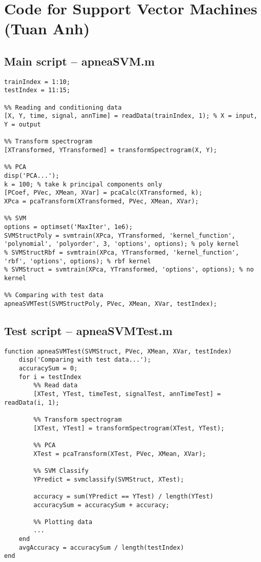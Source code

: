 \chapter{Code for Support Vector Machines (Tuan Anh)}
\label{ch:SVMCode}

\section{Main script -- apneaSVM.m}
\label{sec:apneaSVM}
\begin{lstlisting}
trainIndex = 1:10;
testIndex = 11:15;

%% Reading and conditioning data
[X, Y, time, signal, annTime] = readData(trainIndex, 1); % X = input, Y = output

%% Transform spectrogram
[XTransformed, YTransformed] = transformSpectrogram(X, Y);

%% PCA
disp('PCA...');
k = 100; % take k principal components only
[PCoef, PVec, XMean, XVar] = pcaCalc(XTransformed, k);
XPca = pcaTransform(XTransformed, PVec, XMean, XVar);

%% SVM
options = optimset('MaxIter', 1e6);
SVMStructPoly = svmtrain(XPca, YTransformed, 'kernel_function', 'polynomial', 'polyorder', 3, 'options', options); % poly kernel
% SVMStructRbf = svmtrain(XPca, YTransformed, 'kernel_function', 'rbf', 'options', options); % rbf kernel
% SVMStruct = svmtrain(XPca, YTransformed, 'options', options); % no kernel

%% Comparing with test data
apneaSVMTest(SVMStructPoly, PVec, XMean, XVar, testIndex);
\end{lstlisting}

\section{Test script -- apneaSVMTest.m}
\label{sec:apneaSVMTest}
\begin{lstlisting}
function apneaSVMTest(SVMStruct, PVec, XMean, XVar, testIndex)
    disp('Comparing with test data...');
    accuracySum = 0;
    for i = testIndex
        %% Read data
        [XTest, YTest, timeTest, signalTest, annTimeTest] = readData(i, 1);
        
        %% Transform spectrogram
        [XTest, YTest] = transformSpectrogram(XTest, YTest);
        
        %% PCA
        XTest = pcaTransform(XTest, PVec, XMean, XVar);

        %% SVM Classify
        YPredict = svmclassify(SVMStruct, XTest);
        
        accuracy = sum(YPredict == YTest) / length(YTest)
        accuracySum = accuracySum + accuracy;
        
        %% Plotting data
        ...
    end
    avgAccuracy = accuracySum / length(testIndex)
end
\end{lstlisting}